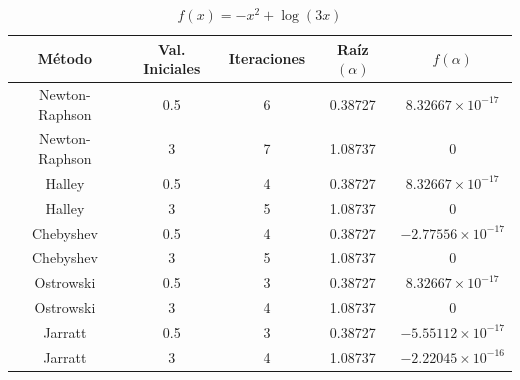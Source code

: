 \begin{table}[H]
\centering

\renewcommand{\arraystretch}{1.3} %
\setlength{\tabcolsep}{12pt}      %

\begin{tabular}{ccccc}
\hline
Método & Val. Iniciales & Iteraciones & Raíz $(\alpha)$ & $f(\alpha)$ \\
\hline

Newton-Raphson & 0.5 & 6 & 0.38727 & $8.32667\times10^{-17}$ \\

Newton-Raphson & 3   & 7 & 1.08737 & 0                    \\

Halley         & 0.5 & 4 & 0.38727 & $8.32667\times10^{-17}$ \\

Halley         & 3   & 5 & 1.08737 & 0                    \\

Chebyshev      & 0.5 & 4 & 0.38727 & $-2.77556\times10^{-17}$ \\

Chebyshev      & 3   & 5 & 1.08737 & 0                    \\

Ostrowski      & 0.5 & 3 & 0.38727 & $8.32667\times10^{-17}$ \\

Ostrowski      & 3   & 4 & 1.08737 & 0                    \\

Jarratt        & 0.5 & 3 & 0.38727 & $-5.55112\times10^{-17}$ \\

Jarratt        & 3   & 4 & 1.08737 & $-2.22045\times10^{-16}$ \\

\hline
\end{tabular}

\caption{$f(x) = - x^{2} + \log{\left(3 x \right)}$}
\end{table}


